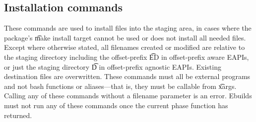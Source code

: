 \subsection{Installation commands}
These commands are used to install files into the staging area, in cases where the package's \t{make
install} target cannot be used or does not install all needed files. Except where otherwise stated,
all filenames created or modified are relative to the staging directory including the offset-prefix
\t{ED} in offset-prefix aware EAPIs, or just the staging directory \t{D} in offset-prefix agnostic
EAPIs. Existing destination files are overwritten. These commands must all be external programs and
not bash functions or aliases---that is, they must be callable from \t{xargs}. Calling any of these
commands without a filename parameter is an error. Ebuilds must not run any of these commands once
the current phase function has returned.


